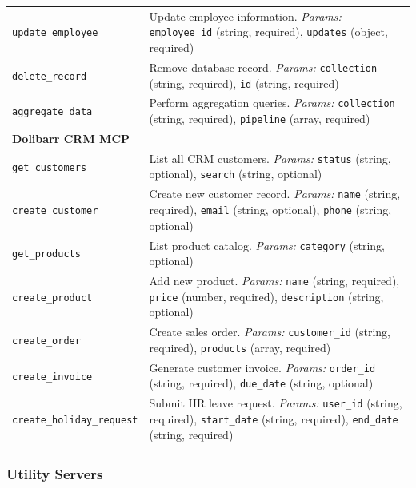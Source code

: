 \documentclass{article}
\theoremstyle{plain}
\theoremstyle{definition}
\theoremstyle{remark}
\begin{document}
{\begin{longtable}{p{4.5cm} p{10cm}}
\texttt{update\_employee} & Update employee information. \textit{Params:} \texttt{employee\_id} (string, required), \texttt{updates} (object, required) \\

\texttt{delete\_record} & Remove database record. \textit{Params:} \texttt{collection} (string, required), \texttt{id} (string, required) \\

\texttt{aggregate\_data} & Perform aggregation queries. \textit{Params:} \texttt{collection} (string, required), \texttt{pipeline} (array, required) \\

\multicolumn{2}{l}{\textbf{Dolibarr CRM MCP}} \\
\texttt{get\_customers} & List all CRM customers. \textit{Params:} \texttt{status} (string, optional), \texttt{search} (string, optional) \\

\texttt{create\_customer} & Create new customer record. \textit{Params:} \texttt{name} (string, required), \texttt{email} (string, optional), \texttt{phone} (string, optional) \\

\texttt{get\_products} & List product catalog. \textit{Params:} \texttt{category} (string, optional) \\

\texttt{create\_product} & Add new product. \textit{Params:} \texttt{name} (string, required), \texttt{price} (number, required), \texttt{description} (string, optional) \\

\texttt{create\_order} & Create sales order. \textit{Params:} \texttt{customer\_id} (string, required), \texttt{products} (array, required) \\

\texttt{create\_invoice} & Generate customer invoice. \textit{Params:} \texttt{order\_id} (string, required), \texttt{due\_date} (string, optional) \\

\texttt{create\_holiday\_request} & Submit HR leave request. \textit{Params:} \texttt{user\_id} (string, required), \texttt{start\_date} (string, required), \texttt{end\_date} (string, required) \\

\end{longtable}
}

\subsubsection{Utility Servers}
\end{document}
